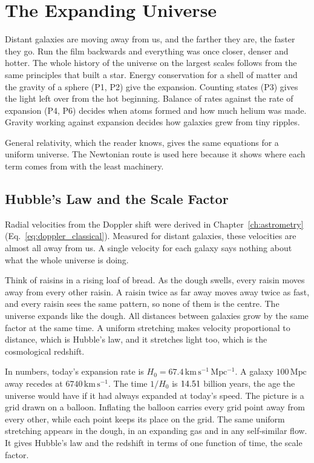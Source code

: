 \chapter{The Expanding Universe}
\label{ch:universe}





Distant galaxies are moving away from us, and the farther they are, the faster they go. Run the film backwards and everything was once closer, denser and hotter. The whole history of the universe on the largest scales follows from the same principles that built a star. Energy conservation for a shell of matter and the gravity of a sphere (P1, P2) give the expansion. Counting states (P3) gives the light left over from the hot beginning. Balance of rates against the rate of expansion (P4, P6) decides when atoms formed and how much helium was made. Gravity working against expansion decides how galaxies grew from tiny ripples.

General relativity, which the reader knows, gives the same equations for a uniform universe. The Newtonian route is used here because it shows where each term comes from with the least machinery.

\section{Hubble's Law and the Scale Factor}
\label{un:sec:hubble}

Radial velocities from the Doppler shift were derived in Chapter~\ref{ch:astrometry} (Eq.~\eqref{eq:doppler_classical}). Measured for distant galaxies, these velocities are almost all away from us. A single velocity for each galaxy says nothing about what the whole universe is doing.

Think of raisins in a rising loaf of bread. As the dough swells, every raisin moves away from every other raisin. A raisin twice as far away moves away twice as fast, and every raisin sees the same pattern, so none of them is the centre. The universe expands like the dough. All distances between galaxies grow by the same factor at the same time. A uniform stretching makes velocity proportional to distance, which is Hubble's law, and it stretches light too, which is the cosmological redshift.

In numbers, today's expansion rate is $H_0=67.4\,\mathrm{km\,s^{-1}\,Mpc^{-1}}$. A galaxy $100\,\mathrm{Mpc}$ away recedes at $6740\,\mathrm{km\,s^{-1}}$. The time $1/H_0$ is $14.51$ billion years, the age the universe would have if it had always expanded at today's speed. The picture is a grid drawn on a balloon. Inflating the balloon carries every grid point away from every other, while each point keeps its place on the grid. The same uniform stretching appears in the dough, in an expanding gas and in any self-similar flow. It gives Hubble's law and the redshift in terms of one function of time, the scale factor.


